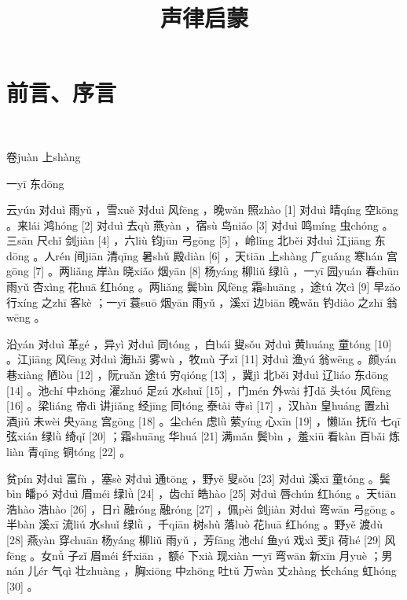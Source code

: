 \documentclass[12pt,UTF8]{ctexbook}
\title{\heiti\zihao{0} 声律启蒙}
\author{}
\date{}
\begin{document}
\maketitle
\tableofcontents

\frontmatter
\chapter{前言、序言}

\mainmatter

~\\

 \qquad  

卷juàn 上shàng


一yī 东dōng


云yún 对duì 雨yǔ ，雪xuě 对duì 风fēng ，晚wǎn 照zhào [1] 对duì 晴qíng 空kōng 。来lái 鸿hóng [2] 对duì 去qù 燕yàn ，宿sù 鸟niǎo [3] 对duì 鸣míng 虫chóng 。三sān 尺chǐ 剑jiàn [4] ，六liù 钧jūn 弓gōng [5] ，岭lǐng 北běi 对duì 江jiāng 东dōng 。人rén 间jiān 清qīng 暑shǔ 殿diàn [6] ，天tiān 上shàng 广guǎng 寒hán 宫gōng [7] 。两liǎng 岸àn 晓xiǎo 烟yān [8] 杨yáng 柳liǔ 绿lǜ ，一yī 园yuán 春chūn 雨yǔ 杏xìng 花huā 红hóng 。两liǎng 鬓bìn 风fēng 霜shuāng ，途tú 次cì [9] 早zǎo 行xíng 之zhī 客kè ；一yī 蓑suō 烟yān 雨yǔ ，溪xī 边biān 晚wǎn 钓diào 之zhī 翁wēng 。

沿yán 对duì 革gé ，异yì 对duì 同tóng ，白bái 叟sǒu 对duì 黄huáng 童tóng [10] 。江jiāng 风fēng 对duì 海hǎi 雾wù ，牧mù 子zǐ [11] 对duì 渔yú 翁wēng 。颜yán 巷xiàng 陋lòu [12] ，阮ruǎn 途tú 穷qióng [13] ，冀jì 北běi 对duì 辽liáo 东dōng [14] 。池chí 中zhōng 濯zhuó 足zú 水shuǐ [15] ，门mén 外wài 打dǎ 头tóu 风fēng [16] 。梁liáng 帝dì 讲jiǎng 经jīng 同tóng 泰tài 寺sì [17] ，汉hàn 皇huáng 置zhì 酒jiǔ 未wèi 央yāng 宫gōng [18] 。尘chén 虑lǜ 萦yíng 心xīn [19] ，懒lǎn 抚fǔ 七qī 弦xián 绿lǜ 绮qǐ [20] ；霜shuāng 华huá [21] 满mǎn 鬓bìn ，羞xiū 看kàn 百bǎi 炼liàn 青qīng 铜tóng [22] 。

贫pín 对duì 富fù ，塞sè 对duì 通tōng ，野yě 叟sǒu [23] 对duì 溪xī 童tóng 。鬓bìn 皤pó 对duì 眉méi 绿lǜ [24] ，齿chǐ 皓hào [25] 对duì 唇chún 红hóng 。天tiān 浩hào 浩hào [26] ，日rì 融róng 融róng [27] ，佩pèi 剑jiàn 对duì 弯wān 弓gōng 。半bàn 溪xī 流liú 水shuǐ 绿lǜ ，千qiān 树shù 落luò 花huā 红hóng 。野yě 渡dù [28] 燕yàn 穿chuān 杨yáng 柳liǔ 雨yǔ ，芳fāng 池chí 鱼yú 戏xì 芰jì 荷hé [29] 风fēng 。女nǚ 子zǐ 眉méi 纤xiān ，额é 下xià 现xiàn 一yī 弯wān 新xīn 月yuè ；男nán 儿ér 气qì 壮zhuàng ，胸xiōng 中zhōng 吐tǔ 万wàn 丈zhàng 长cháng 虹hóng [30] 。
\end{document}
